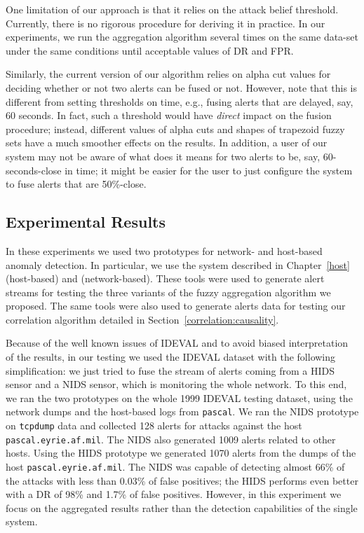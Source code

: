 \begin{note}
  One limitation of our approach is that it relies on the attack
  belief threshold. Currently, there is no rigorous procedure for
  deriving it in practice. In our experiments, we run the aggregation
  algorithm several times on the same data-set under the same
  conditions until acceptable values of DR and FPR.

  Similarly, the current version of our algorithm relies on alpha cut
  values for deciding whether or not two alerts can be fused or
  not. However, note that this is different from setting thresholds on
  time, e.g., fusing alerts that are delayed, say, 60 seconds. In
  fact, such a threshold would have \emph{direct} impact on the fusion
  procedure; instead, different values of alpha cuts and shapes of
  trapezoid fuzzy sets have a much smoother effects on the results. In
  addition, a user of our system may not be aware of what does it
  means for two alerts to be, say, 60-seconds-close in time; it might
  be easier for the user to just configure the system to fuse alerts
  that are 50\%-close.
\end{note}

\subsection{Experimental Results}
\label{sec:anom-detect-prot}
In these experiments we used two prototypes for network- and
host-based anomaly detection. In particular, we use the system
described in Chapter~\ref{host} (host-based) and
\citep{zanero-savaresi,zanero-pattern} (network-based). These tools
were used to generate alert streams for testing the three variants of
the fuzzy aggregation algorithm we proposed. The same tools were also
used to generate alerts data for testing our correlation algorithm
detailed in Section~\ref{correlation:causality}.

Because of the well known issues of \ac{IDEVAL} and to
avoid biased interpretation of the results, in our testing we used the
\ac{IDEVAL} dataset with the following simplification:
we just tried to fuse the stream of alerts coming from a
\ac{HIDS} sensor and a \ac{NIDS} sensor, which
is monitoring the whole network. To this end, we ran the two
prototypes on the whole 1999 \ac{IDEVAL} testing
dataset, using the network dumps and the host-based logs from
\texttt{pascal}. We ran the \ac{NIDS} prototype on
\texttt{tcpdump} data and collected 128 alerts for attacks against the
host \texttt{pascal.\-eyrie.\-af.\-mil}. The \ac{NIDS}
also generated 1009 alerts related to other hosts. Using the
\ac{HIDS} prototype we generated 1070 alerts from the
dumps of the host \texttt{pascal.\-eyrie.\-af.\-mil}. The
\ac{NIDS} was capable of detecting almost 66\% of the
attacks with less than 0.03\% of false positives; the
\ac{HIDS} performs even better with a \ac{DR} of 98\% and
1.7\% of false positives. However, in this experiment we focus on the
aggregated results rather than the detection capabilities of the
single system.

